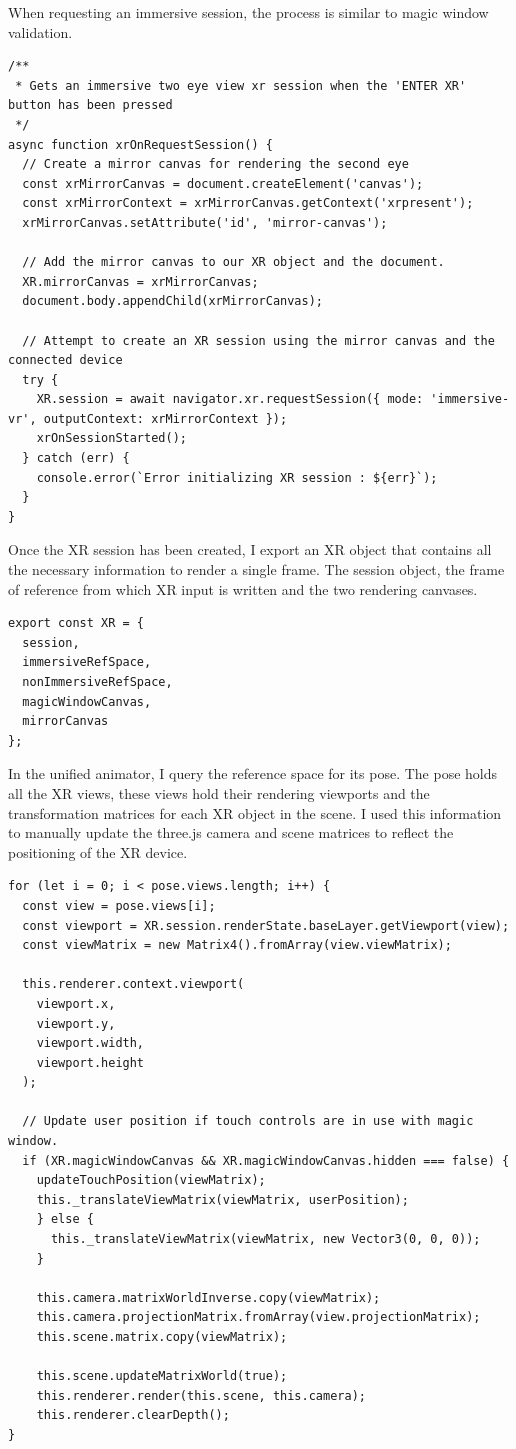 \documentclass[onecolumn, draftclsnofoot,10pt, compsoc]{IEEEtran}
\begin{document}
    When requesting an immersive session, the process is similar to magic window validation.
    \begin{lstlisting}
/**
 * Gets an immersive two eye view xr session when the 'ENTER XR' button has been pressed
 */
async function xrOnRequestSession() {
  // Create a mirror canvas for rendering the second eye
  const xrMirrorCanvas = document.createElement('canvas');
  const xrMirrorContext = xrMirrorCanvas.getContext('xrpresent');
  xrMirrorCanvas.setAttribute('id', 'mirror-canvas');

  // Add the mirror canvas to our XR object and the document.
  XR.mirrorCanvas = xrMirrorCanvas;
  document.body.appendChild(xrMirrorCanvas);

  // Attempt to create an XR session using the mirror canvas and the connected device
  try {
    XR.session = await navigator.xr.requestSession({ mode: 'immersive-vr', outputContext: xrMirrorContext });
    xrOnSessionStarted();
  } catch (err) {
    console.error(`Error initializing XR session : ${err}`);
  }
}
    \end{lstlisting}
    
    Once the XR session has been created, I export an XR object that contains all the necessary information to render a single frame. The session object, the frame of reference from which XR input is written and the two rendering canvases.
    \begin{lstlisting}
export const XR = {
  session,
  immersiveRefSpace,
  nonImmersiveRefSpace,
  magicWindowCanvas,
  mirrorCanvas
};
    \end{lstlisting}
    
    In the unified animator, I query the reference space for its pose. The pose holds all the XR views, these views hold their rendering viewports and the transformation matrices for each XR object in the scene. I used this information to manually update the three.js camera and scene matrices to reflect the positioning of the XR device.
    \begin{lstlisting}
for (let i = 0; i < pose.views.length; i++) {
  const view = pose.views[i];
  const viewport = XR.session.renderState.baseLayer.getViewport(view);
  const viewMatrix = new Matrix4().fromArray(view.viewMatrix);

  this.renderer.context.viewport(
    viewport.x,
    viewport.y,
    viewport.width,
    viewport.height
  );

  // Update user position if touch controls are in use with magic window.
  if (XR.magicWindowCanvas && XR.magicWindowCanvas.hidden === false) {
    updateTouchPosition(viewMatrix);
    this._translateViewMatrix(viewMatrix, userPosition);
    } else {
      this._translateViewMatrix(viewMatrix, new Vector3(0, 0, 0));
    }

    this.camera.matrixWorldInverse.copy(viewMatrix);
    this.camera.projectionMatrix.fromArray(view.projectionMatrix);
    this.scene.matrix.copy(viewMatrix);

    this.scene.updateMatrixWorld(true);
    this.renderer.render(this.scene, this.camera);
    this.renderer.clearDepth();
}
    \end{lstlisting}
    
\end{document}

